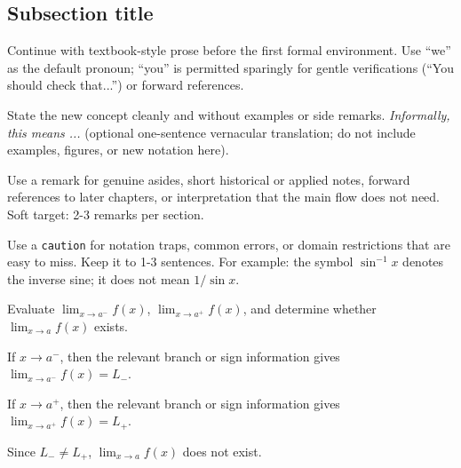 
\subsection{Subsection title}

Continue with textbook-style prose before the first formal environment.
Use ``we'' as the default pronoun; ``you'' is permitted sparingly for
gentle verifications (``You should check that...'') or forward references.

\begin{definition}
State the new concept cleanly and without examples or side remarks.
\emph{Informally, this means ...} (optional one-sentence vernacular
translation; do not include examples, figures, or new notation here).
\end{definition}

\begin{remark}
Use a remark for genuine asides, short historical or applied notes,
forward references to later chapters, or interpretation that the main
flow does not need. Soft target: 2-3 remarks per section.
\end{remark}

\begin{caution}
Use a \texttt{caution} for notation traps, common errors, or domain
restrictions that are easy to miss. Keep it to 1-3 sentences. For example:
the symbol \(\sin^{-1}x\) denotes the inverse sine; it does not mean
\(1/\sin x\).
\end{caution}

\begin{workedexample}
\begin{example}
Evaluate \(\lim_{x\to a^-}f(x)\), \(\lim_{x\to a^+}f(x)\), and determine
whether \(\lim_{x\to a}f(x)\) exists.
\end{example}

\begin{solution}
If \(x\to a^{-}\), then the relevant branch or sign information gives
\(\lim_{x\to a^-}f(x)=L_-\).

If \(x\to a^{+}\), then the relevant branch or sign information gives
\(\lim_{x\to a^+}f(x)=L_+\).

Since \(L_- \ne L_+\), \(\lim_{x\to a}f(x)\) does not exist.
\end{solution}
\end{workedexample}

